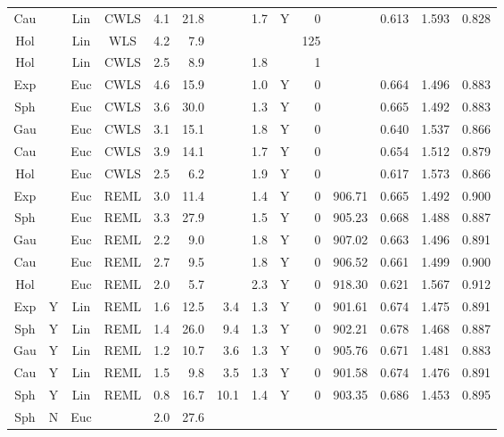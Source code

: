 \documentclass[11pt, titlepage]{article}\usepackage[]{graphicx}\usepackage[]{color}
\begin{document}
\begin{spacing}{1.9}
\begin{flushleft}
\begin{table}[ht]
\begin{center}
\begin{tabular}{cc|cc|rrrr|rr|rrrr}
  Cau &  & Lin & CWLS & 4.1 & 21.8 &  & 1.7 & Y & 0 &  & 0.613 & 1.593 & 0.828 \\ 
  Hol &  & Lin & WLS & 4.2 & 7.9 &  &  &   & 125 &  &  &  &  \\ 
  Hol &  & Lin & CWLS & 2.5 & 8.9 &  & 1.8 &   & 1 &  &  &  &  \\ 
  Exp &  & Euc & CWLS & 4.6 & 15.9 &  & 1.0 & Y & 0 &  & 0.664 & 1.496 & 0.883 \\ 
  Sph &  & Euc & CWLS & 3.6 & 30.0 &  & 1.3 & Y & 0 &  & 0.665 & 1.492 & 0.883 \\ 
  Gau &  & Euc & CWLS & 3.1 & 15.1 &  & 1.8 & Y & 0 &  & 0.640 & 1.537 & 0.866 \\ 
  Cau &  & Euc & CWLS & 3.9 & 14.1 &  & 1.7 & Y & 0 &  & 0.654 & 1.512 & 0.879 \\ 
  Hol &  & Euc & CWLS & 2.5 & 6.2 &  & 1.9 & Y & 0 &  & 0.617 & 1.573 & 0.866 \\ 
  Exp &  & Euc & REML & 3.0 & 11.4 &  & 1.4 & Y & 0 & 906.71 & 0.665 & 1.492 & 0.900 \\ 
  Sph &  & Euc & REML & 3.3 & 27.9 &  & 1.5 & Y & 0 & 905.23 & 0.668 & 1.488 & 0.887 \\ 
  Gau &  & Euc & REML & 2.2 & 9.0 &  & 1.8 & Y & 0 & 907.02 & 0.663 & 1.496 & 0.891 \\ 
  Cau &  & Euc & REML & 2.7 & 9.5 &  & 1.8 & Y & 0 & 906.52 & 0.661 & 1.499 & 0.900 \\ 
  Hol &  & Euc & REML & 2.0 & 5.7 &  & 2.3 & Y & 0 & 918.30 & 0.621 & 1.567 & 0.912 \\ 
  Exp & Y & Lin & REML & 1.6 & 12.5 & 3.4 & 1.3 & Y & 0 & 901.61 & 0.674 & 1.475 & 0.891 \\ 
  Sph & Y & Lin & REML & 1.4 & 26.0 & 9.4 & 1.3 & Y & 0 & 902.21 & 0.678 & 1.468 & 0.887 \\ 
  Gau & Y & Lin & REML & 1.2 & 10.7 & 3.6 & 1.3 & Y & 0 & 905.76 & 0.671 & 1.481 & 0.883 \\ 
  Cau & Y & Lin & REML & 1.5 & 9.8 & 3.5 & 1.3 & Y & 0 & 901.58 & 0.674 & 1.476 & 0.891 \\ 
   \hline

  \hline
Sph & Y & Lin & REML & 0.8 & 16.7 & 10.1 & 1.4 & Y & 0 & 903.35 & 0.686 & 1.453 & 0.895 \\ 
  Sph & N & Euc &   & 2.0 & 27.6 &  &  &  &  &  &  &  &  \\ 
   \hline

\end{tabular}
\end{center}
\end{table}


\end{flushleft}
\end{spacing}
\end{document}

